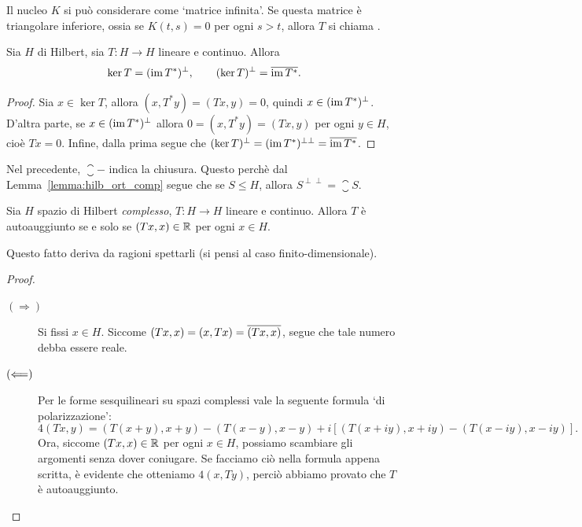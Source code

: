 \begin{remark}
	Il nucleo $K$ si può considerare come `matrice infinita'. Se questa matrice è triangolare inferiore, ossia se $K(t,s) = 0$ per ogni $s>t$, allora $T$ si chiama .
\end{remark}

\begin{lemma}
	Sia $H$ di Hilbert, sia $T : H \to H$ lineare e continuo.
	Allora
	\begin{equation*}
		\ker T = (\operatorname{im} T^*)^\perp, \qquad (\ker T)^\perp = \overline{\operatorname{im} T^*}.
	\end{equation*}
\end{lemma}
\begin{proof}
	Sia $x \in \ker T$, allora $(x, T^*y) = (Tx, y)=0$, quindi $x \in (\operatorname{im} T^*)^\perp$.
	D'altra parte, se $x \in (\operatorname{im} T^*)^\perp$ allora $0 = (x, T^*y) = (Tx,y)$ per ogni $y \in H$, cioè $Tx = 0$.
	Infine, dalla prima segue che $(\ker T)^\perp = (\operatorname{im} T^*)^{\perp\perp} = \overline{\operatorname{im} T^*}$.
\end{proof}

\begin{remark}
	Nel precedente, $\closure{-}$ indica la chiusura. Questo perchè dal Lemma~\ref{lemma:hilb_ort_comp} segue che se $S \leq H$, allora $S^{\perp\perp} = \closure{S}$.
\end{remark}

\begin{theorem}
	Sia $H$ spazio di Hilbert \emph{complesso}, $T:H \to H$ lineare e continuo.
	Allora $T$ è autoauggiunto se e solo se $(Tx, x) \in \mathbb{R}$ per ogni $x \in H$.
\end{theorem}
\begin{remark}
	Questo fatto deriva da ragioni spettarli (si pensi al caso finito-dimensionale).
\end{remark}
\begin{proof}
	\leavevmode
	\begin{description}
		\item[$(\Longrightarrow)$] Si fissi $x \in H$. Siccome $(Tx,x) = (x,Tx) = \overline{(Tx,x)}$, segue che tale numero debba essere reale.
		\item[$(\Longleftarrow)$] Per le forme sesquilineari su spazi complessi vale la seguente formula `di polarizzazione':
		\begin{equation*}
			4 (Tx,y) = (T(x+y),x+y) - (T(x-y), x-y) + i\left[ (T(x+iy),x+iy) - (T(x-iy), x-iy) \right].
		\end{equation*}
		Ora, siccome $(Tx,x) \in \mathbb{R}$ per ogni $x \in H$, possiamo scambiare gli argomenti senza dover coniugare. Se facciamo ciò nella formula appena scritta, è evidente che otteniamo $4(x,Ty)$, perciò abbiamo provato che $T$ è autoauggiunto.
	\end{description}
\end{proof}


